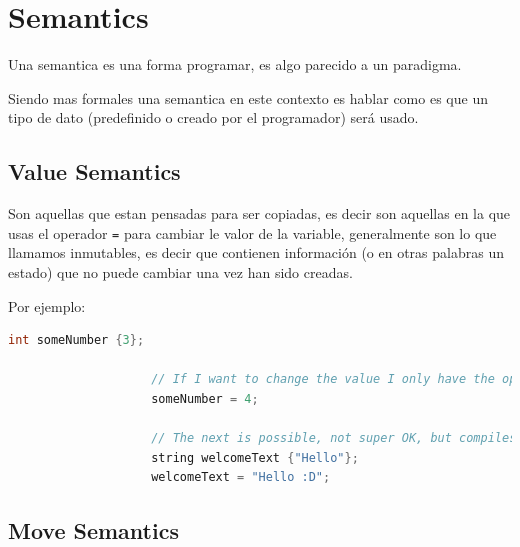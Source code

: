 \documentclass[12pt, fleqn]{report}                             %
\theoremstyle{break}                                            %
\newcommand{\textCode}[1]  { \texttt{#1} }                      %
\begin{document}
        \clearpage
        \section{Semantics}   

            Una semantica es una forma programar, es algo parecido a un paradigma.
            
            Siendo mas formales una semantica en este contexto es hablar
            como es que un tipo de dato (predefinido o creado por el programador) será usado.

            \subsection{Value Semantics}  
            
                Son aquellas que estan pensadas para ser copiadas, es decir son aquellas en la que usas
                el operador \textCode{=} para cambiar le valor de la variable, generalmente son lo que llamamos
                inmutables, es decir que contienen información (o en otras palabras un estado) que no puede
                cambiar una vez han sido creadas.

                Por ejemplo:
                \begin{lstlisting}[language=C++, gobble=20]
                    int someNumber {3};

                    // If I want to change the value I only have the option to use =
                    someNumber = 4;

                    // The next is possible, not super OK, but compiles
                    string welcomeText {"Hello"};
                    welcomeText = "Hello :D";
                \end{lstlisting}
            

            \subsection{Move Semantics}     
            
\end{document}
